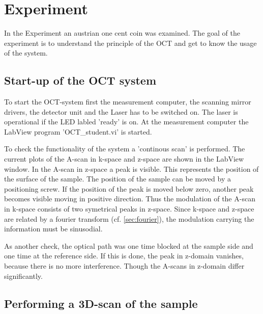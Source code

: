 \chapter{Experiment}

In the Experiment an austrian one cent coin was examined. The goal of the experiment is to understand the principle of the OCT and get to know the usage of the system.

\section{Start-up of the OCT system}

To start the OCT-system first the measurement computer, the scanning mirror drivers, the detector unit and the Laser has to be switched on. The laser is operational if the LED labled 'ready' is on. At the measurement computer the LabView program 'OCT\_student.vi' is started.

To check the functionality of the system a 'continous scan' is performed. The current plots of the A-scan in k-space and z-space are shown in the LabView window. In the A-scan in z-space a peak is visible. This represents the position of the surface of the sample. The position of the sample can be moved by a positioning screw. If the position of the peak is moved below zero, another peak becomes visible moving in positive direction. Thus the modulation of the A-scan in k-space consists of two symetrical peaks in z-space. Since k-space and z-space are related by a fourier transform (cf. \ref{sec:fourier}), the modulation carrying the information must be sinusodial. 

As another check, the optical path was one time blocked at the sample side and one time at the reference side. If this is done, the peak in z-domain vanishes, because there is no more interference. Though the A-scans in z-domain differ significantly. 


\section{Performing a 3D-scan of the sample}